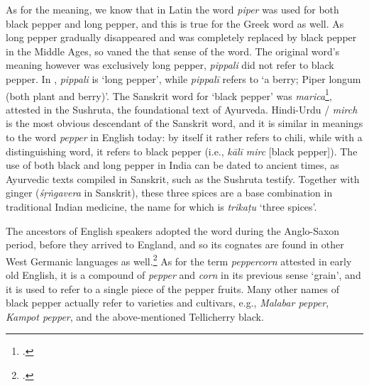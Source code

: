 As for the meaning, we know that in Latin the word \textit{piper} was used for both black pepper and long pepper, and this is true for the Greek word as well. As long pepper gradually disappeared and was completely replaced by black pepper in the Middle Ages, so vaned the that sense of the word. The original word's meaning however was exclusively long pepper, \textit{pippali} did not refer to black pepper. In \textcite{monier-williams_sanskrit-english_1899}, \textit{pippali} is `long pepper', while \textit{pippalī} refers to `a berry; Piper longum (both plant and berry)'. The Sanskrit word for `black pepper' was  \textit{marica}\footcite[790]{monier-williams_sanskrit-english_1899}, attested in the \gls{Sushruta}, the foundational text of \gls{Ayurveda}. Hindi-Urdu / \textit{mirch} is the most obvious descendant of the Sanskrit word, and it is similar in meanings to the word \textit{pepper} in English today: by itself it rather refers to chili, while with a distinguishing word, it refers to black pepper (i.e., \textit{kālī mirc} [black pepper]). The use of both black and long pepper in India can be dated to ancient times, as Ayurvedic texts compiled in Sanskrit, such as the \gls{Sushruta} testify. Together with ginger (\textit{śṛṅgavera} in Sanskrit), these three spices are a base combination in traditional Indian medicine, the name for which is  \textit{trikaṭu} `three spices'.

The ancestors of English speakers adopted the word during the Anglo-Saxon period, before they arrived to England, and so its cognates are found in other West Germanic languages as well.\footcite[pepper]{cresswell_oxford_2021} As for the term \textit{peppercorn} attested in early old English, it is a compound of \textit{pepper} and \textit{corn}  in its previous sense `grain', and it is used to refer to a single piece of the pepper fruits. Many other names of black pepper actually refer to varieties and cultivars, e.g., \textit{Malabar pepper}, \textit{Kampot pepper}, and the above-mentioned Tellicherry black.



